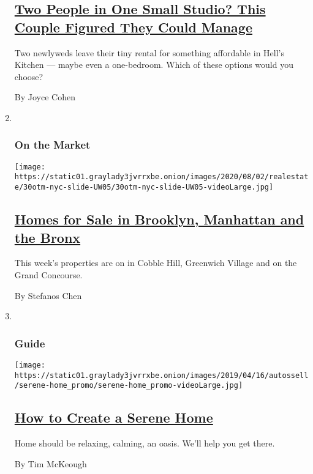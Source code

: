 \begin{enumerate}
  \hypertarget{two-people-in-one-small-studio-this-couple-figured-they-could-manage}{%
  \subsection{\texorpdfstring{\href{/interactive/2020/07/30/realestate/30hunt-sato.html}{Two
  People in One Small Studio? This Couple Figured They Could
  Manage}}{Two People in One Small Studio? This Couple Figured They Could Manage}}\label{two-people-in-one-small-studio-this-couple-figured-they-could-manage}}

  Two newlyweds leave their tiny rental for something affordable in
  Hell's Kitchen --- maybe even a one-bedroom. Which of these options
  would you choose?

  By Joyce Cohen
\item ~
  \hypertarget{on-the-market}{%
  \subsubsection{On the Market}\label{on-the-market}}

  \texttt{[image: https://static01.graylady3jvrrxbe.onion/images/2020/08/02/realestate/30otm-nyc-slide-UW05/30otm-nyc-slide-UW05-videoLarge.jpg]}

  \hypertarget{homes-for-sale-in-brooklyn-manhattan-and-the-bronx}{%
  \subsection{\texorpdfstring{\href{/2020/07/30/realestate/homes-for-sale-in-brooklyn-manhattan-and-the-bronx.html}{Homes
  for Sale in Brooklyn, Manhattan and the
  Bronx}}{Homes for Sale in Brooklyn, Manhattan and the Bronx}}\label{homes-for-sale-in-brooklyn-manhattan-and-the-bronx}}

  This week's properties are on in Cobble Hill, Greenwich Village and on
  the Grand Concourse.

  By Stefanos Chen
\item ~
  \hypertarget{guide}{%
  \subsubsection{Guide}\label{guide}}

  \texttt{[image: https://static01.graylady3jvrrxbe.onion/images/2019/04/16/autossell/serene-home\_promo/serene-home\_promo-videoLarge.jpg]}

  \hypertarget{how-to-create-a-serene-home}{%
  \subsection{\texorpdfstring{\href{/interactive/2019/05/15/smarter-living/serene-home.html}{How
  to Create a Serene
  Home}}{How to Create a Serene Home}}\label{how-to-create-a-serene-home}}

  Home should be relaxing, calming, an oasis. We'll help you get there.

  By Tim McKeough
\end{enumerate}


